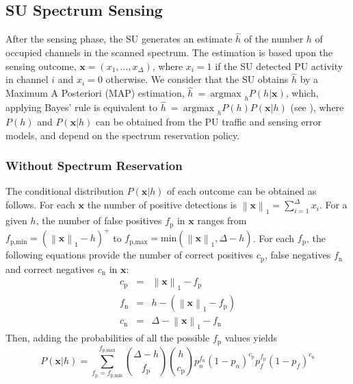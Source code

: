 \subsection{SU Spectrum Sensing}
After the sensing phase, the SU generates an estimate $\hat{h}$ of the number $h$ of occupied channels in the scanned spectrum.
The estimation is based upon the sensing outcome, $\mathbf{x} = \left(x_{1},\dots,x_{\Delta}\right)$, where $x_{i} = 1$ if the SU detected PU activity in channel $i$ and $x_{i} = 0$ otherwise. We consider that the SU obtains $\hat{h}$ by a Maximum A Posteriori (MAP) estimation, $\hat{h}~=~\text{argmax }_{h} P\left(h|\mathbf{x}\right)$, which, applying Bayes' rule is equivalent to $\hat{h}~=~\text{argmax }_{h} P\left(h\right)P\left(\mathbf{x}|h\right)$ (see \cite{ref:Bertsekas2008}),
where $P\left(h\right)$ and $P\left(\mathbf{x}|h\right)$ can be obtained from the PU traffic and sensing error models, and depend on the spectrum reservation policy.

\subsubsection{Without Spectrum Reservation}
The conditional distribution $P\left(\mathbf{x}|h\right)$ of each outcome can be obtained as follows.
For each $\mathbf{x}$ the number of positive detections is $\left\|\mathbf{x}\right\|_{1}=\sum_{i=1}^{\Delta}x_{i}$.
For a given $h$, the number of false positives $f_{\text{p}}$ in $\mathbf{x}$ ranges from $f_{\text{p,min}}=\left(\left\|\mathbf{x}\right\|_{1}-h\right)^{+}$ to $f_{\text{p,max}}=\text{min}\left(\left\|\mathbf{x}\right\|_{1},\Delta-h\right)$.
For each $f_{\text{p}}$, the following equations provide the number of correct positives $c_{\text{p}}$, false negatives $f_{\text{n}}$ and correct negatives $c_{\text{n}}$ in $\mathbf{x}$:
\begin{equation}
\begin{array}{lcl}
c_{\text{p}} & = & \left\|\mathbf{x}\right\|_{1} - f_{\text{p}}\\
f_{\text{n}} & = & h-\left(\left\|\mathbf{x}\right\|_{1} - f_{\text{p}}\right)\\
c_{\text{n}} & = & \Delta - \left\|\mathbf{x}\right\|_{1} - f_{\text{n}}
\end{array}
\end{equation}
Then, adding the probabilities of all the possible $f_{\text{p}}$ values yields 
\begin{equation}\label{Pxh}
P\left(\mathbf{x}|h\right) = \displaystyle\sum^{f_{\text{p,max}}}_{f_{\text{p}}=f_{\text{p,min}}}
{\Delta-h \choose f_{\text{p}}}{h \choose c_{\text{p}}} p_{n}^{f_{\text{n}}}\left(1-p_{n}\right)^{c_{\text{p}}}p_{f}^{f_{\text{p}}}\left(1-p_{f}\right)^{c_{\text{n}}}
\end{equation}

